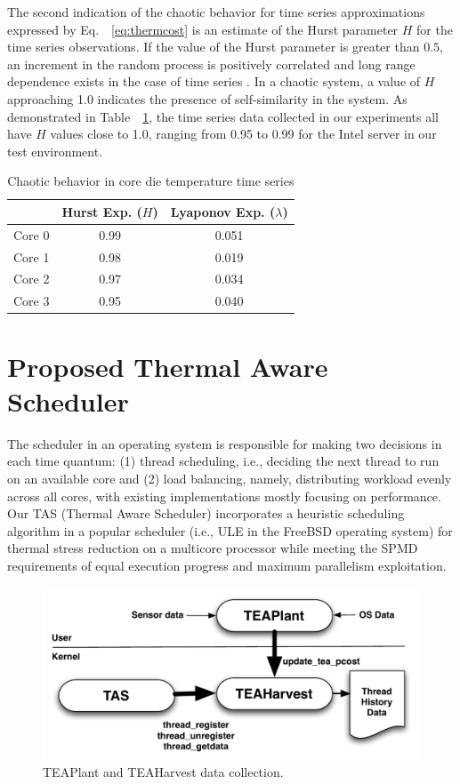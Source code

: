 \documentclass[times, 10pt,twocolumn]{IEEEtran}
\newcommand{\equationnames}{Eq.\ }
\begin{document}
The second indication of the chaotic behavior for time series
approximations expressed by \equationnames~\eqref{eq:thermcost} is an
estimate of the Hurst parameter $H$ for the time series observations. If
the value of the Hurst parameter is greater than $0.5$, an increment in
the random process is positively correlated and long range dependence
exists in the case of time series \cite{Sprott2003}.  In a chaotic
system, a value of $H$ approaching 1.0 indicates the presence of
self-similarity in the system.  As demonstrated in
Table~~\ref{tab:chaotic}, the time series data collected in our
experiments all have $H$ values close to 1.0, ranging from 0.95 to 0.99
for the Intel server in our test environment.

\begin{small}
\begin{table}[tbhp]
\caption{Chaotic behavior in core die temperature time series}
\label{tab:chaotic} 
\centering 
\begin{tabular}{lcc}
\hline
\hline
 & Hurst Exp. ($H$) & Lyaponov Exp. ($\lambda$) \\
\hline
Core 0 & 0.99 & 0.051 \\
Core 1 & 0.98 & 0.019 \\
Core 2 & 0.97 & 0.034 \\
Core 3 & 0.95 & 0.040 \\
\hline
\end{tabular}
\end{table}
\end{small}

\section{Proposed Thermal Aware Scheduler}
\label{sec:sdesign} 
The scheduler in an operating system is responsible for making two
decisions in each time quantum: (1) thread scheduling, i.e., deciding
the next thread to run on an available core and (2) load balancing,
namely, distributing workload evenly across all cores, with existing
implementations mostly focusing on performance.  Our TAS (Thermal Aware
Scheduler) incorporates a heuristic scheduling algorithm in a popular
scheduler (i.e., ULE in the FreeBSD operating system) for thermal stress
reduction on a multicore processor while meeting the SPMD requirements
of equal execution progress and maximum parallelism exploitation.

\begin{figure}[btph] \centering
  \includegraphics[scale=0.45]{tasdesign}
  \caption{TEAPlant and TEAHarvest data collection.}
  \label{fig:teaplant}
\end{figure}
\end{document}
